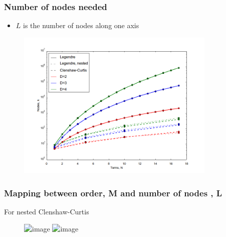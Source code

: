 \documentclass{beamer}
\begin{document}
 
 \begin{frame}
  \frametitle{Number of nodes needed}
  \begin{itemize}
   \item $L$ is the number of nodes along one axis
  \end{itemize}

 \begin{figure}
  \includegraphics[width=0.85\textwidth]{dimensionality_nodes_nested.png}
 \end{figure}
 \end{frame}

  
  \begin{frame}
   \frametitle{Mapping between order, M and number of nodes , L}
   For nested Clenshaw-Curtis
   \begin{figure}
    \includegraphics<1>[width=0.85\textwidth]{LvsM1.png}
    \includegraphics<2>[width=0.85\textwidth]{LvsM.png}
   \end{figure}

   

  \end{frame}

  
  
\end{document}
